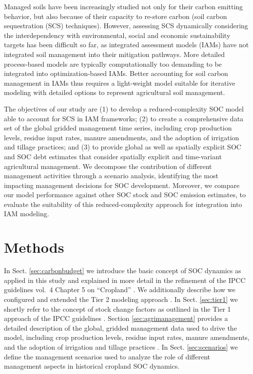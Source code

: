 \documentclass[gc, manuscript]{copernicus}
\begin{document}
Managed soils have been increasingly studied not only for their carbon emitting behavior, but also because of their capacity to re-store carbon (soil carbon sequestration (SCS) techniques). However, assessing SCS dynamically considering the interdependency with environmental, social and economic sustainability targets has been difficult so far, as integrated assessment models (IAMs) \citep{popp_land-use_2016, rogelj_scenarios_2018} have not integrated soil management into their mitigation pathways. More detailed process-based models are typically computationally too demanding to be integrated into optimization-based IAMs. Better accounting for soil carbon management in IAMs thus requires a light-weight model suitable for iterative modeling with detailed options to represent agricultural soil management.

The objectives of our study are (1) to develop a reduced-complexity SOC model able to account for SCS in IAM frameworks; (2) to create a comprehensive data set of the global gridded management time series, including crop production levels, residue input rates, manure amendments, and the adoption of irrigation and tillage practices; and (3) to provide global as well as spatially explicit SOC and SOC debt estimates that consider spatially explicit and time-variant agricultural management.
We decompose the contribution of different management activities through a scenario analysis, identifying the most impacting management decisions for SOC development. Moreover, we compare our model performance against other SOC stock and SOC emission estimates, to evaluate the suitability of this reduced-complexity approach for integration into IAM modeling.
\newpage

\hypertarget{methods}{%
\section{Methods}\label{methods}}

In Sect. \ref{sec:carbonbudget} we introduce the basic concept of SOC dynamics as applied in this study and explained in more detail in the refinement of the IPCC guidelines vol.~4 Chapter 5 on ``Cropland'' \citep{ogle_cropland_in_ipcc_2019}. We additionally describe how we configured and extended the Tier 2 modeling approach \citep[for model code see][]{karstens_mrsoil_2020}. In Sect. \ref{sec:tier1} we shortly refer to the concept of stock change factors as outlined in the Tier 1 approach of the IPCC guidelines \citep{eggleston_ipcc_2006, calvo_buendia_ipcc_2019}.
Section \ref{sec:agrimanagement} provides a detailed description of the global, gridded management data used to drive the model, including crop production levels, residue input rates, manure amendments, and the adoption of irrigation and tillage practices \citep[for model code see][]{bodirsky_mrcommons_2020}. In Sect. \ref{sec:scenarios} we define the management scenarios used to analyze the role of different management aspects in historical cropland SOC dynamics.
\end{document}
